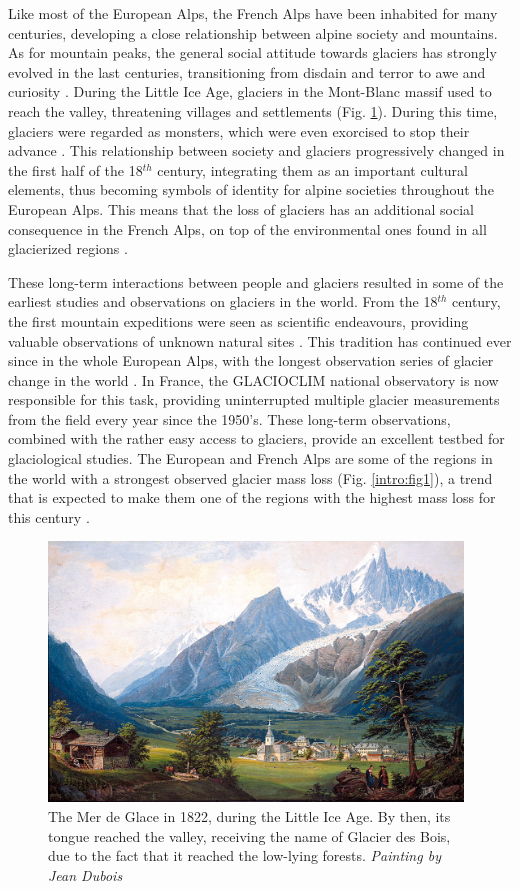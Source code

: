 Like most of the European Alps, the French Alps have been inhabited for many centuries, developing a close relationship between alpine society and mountains. As for mountain peaks, the general social attitude towards glaciers has strongly evolved in the last centuries, transitioning from disdain and terror to awe and curiosity \citep{zryd_les_2008}. During the Little Ice Age, glaciers in the Mont-Blanc massif used to reach the valley, threatening villages and settlements (Fig. \ref{intro:fig3}). During this time, glaciers were regarded as monsters, which were even exorcised to stop their advance \citep{ponchaud_nature_2012}. This relationship between society and glaciers progressively changed in the first half of the 18$^{th}$ century, integrating them as an important cultural elements, thus becoming symbols of identity for alpine societies throughout the European Alps. This means that the loss of glaciers has an additional social consequence in the French Alps, on top of the environmental ones found in all glacierized regions \citep{smit_exploring_2019}. 

These long-term interactions between people and glaciers resulted in some of the earliest studies and observations on glaciers in the world. From the 18$^{th}$ century, the first mountain expeditions were seen as scientific endeavours, providing valuable observations of unknown natural sites \citep{richalet_scientific_2001}. This tradition has continued ever since in the whole European Alps, with the longest observation series of glacier change in the world \citep{glamos_swiss_2019}. In France, the GLACIOCLIM national observatory is now responsible for this task, providing uninterrupted multiple glacier measurements from the field every year since the 1950's. These long-term observations, combined with the rather easy access to glaciers, provide an excellent testbed for glaciological studies. The European and French Alps are some of the regions in the world with a strongest observed glacier mass loss (Fig. \ref{intro:fig1}), a trend that is expected to make them one of the regions with the highest mass loss for this century \citep{marzeion_partitioning_2020}.

\begin{figure}[h]
\centering
\includegraphics[width=11cm]{Figures/intro/Figure_3.jpg}
\caption{The Mer de Glace in 1822, during the Little Ice Age. By then, its tongue reached the valley, receiving the name of Glacier des Bois, due to the fact that it reached the low-lying forests. \textit{Painting by Jean Dubois}} 
\label{intro:fig3}
\end{figure}

